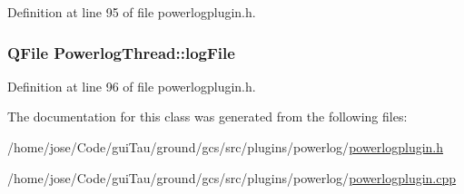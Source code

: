 Definition at line 95 of file powerlogplugin.\-h.

\hypertarget{class_powerlog_thread_a62efcac44703411ff9cf47f57a7f1b86}{
\subsubsection[{log\-File}]{\setlength{\rightskip}{0pt plus 5cm}Q\-File Powerlog\-Thread\-::log\-File\hspace{0.3cm}{\ttfamily [protected]}}}\label{class_powerlog_thread_a62efcac44703411ff9cf47f57a7f1b86}


Definition at line 96 of file powerlogplugin.\-h.



The documentation for this class was generated from the following files\-:\begin{DoxyCompactItemize}
\item 
/home/jose/\-Code/gui\-Tau/ground/gcs/src/plugins/powerlog/\hyperlink{powerlogplugin_8h}{powerlogplugin.\-h}\item 
/home/jose/\-Code/gui\-Tau/ground/gcs/src/plugins/powerlog/\hyperlink{powerlogplugin_8cpp}{powerlogplugin.\-cpp}\end{DoxyCompactItemize}
